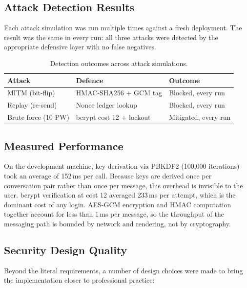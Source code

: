\documentclass[conference]{IEEEtran}
\begin{document}
\subsection{Attack Detection Results}
Each attack simulation was run multiple times against a fresh deployment. The result was the same in every run: all three attacks were detected by the appropriate defensive layer with no false negatives.

\begin{table}[H]
\centering
\caption{Detection outcomes across attack simulations.}
\renewcommand{\arraystretch}{1.15}
\begin{tabular}{lll}
\toprule
\textbf{Attack}      & \textbf{Defence}              & \textbf{Outcome} \\
\midrule
MITM (bit-flip)      & HMAC-SHA256 + GCM tag         & Blocked, every run \\
Replay (re-send)     & Nonce ledger lookup           & Blocked, every run \\
Brute force (10 PW)  & bcrypt cost 12 + lockout      & Mitigated, every run \\
\bottomrule
\end{tabular}
\label{tab:results}
\end{table}

\subsection{Measured Performance}
On the development machine, key derivation via PBKDF2 (100{,}000 iterations) took an average of 152\,ms per call. Because keys are derived once per conversation pair rather than once per message, this overhead is invisible to the user. bcrypt verification at cost 12 averaged 233\,ms per attempt, which is the dominant cost of any login. AES-GCM encryption and HMAC computation together account for less than 1\,ms per message, so the throughput of the messaging path is bounded by network and rendering, not by cryptography.

\subsection{Security Design Quality}
Beyond the literal requirements, a number of design choices were made to bring the implementation closer to professional practice:
\end{document}
